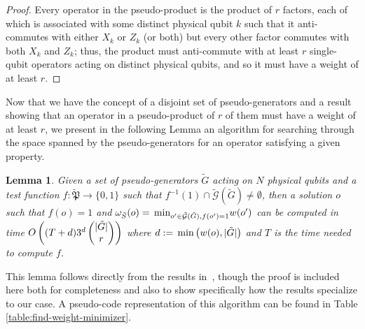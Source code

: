 \documentclass[twocolumn,showpacs,preprintnumbers,amsmath,amssymb,nofootinbib,pra,floatfix]{revtex4-1}
\newtheorem{lemma}{Lemma}
\newenvironment{remark}[1][Remark]{\begin{trivlist}
\item[\hskip \labelsep {\bfseries #1}]}{\end{trivlist}}
\newcommand{\set}{\tilde}
\newcommand{\genfun}{\tilde{\mathcal{G}}}
\newcommand{\pauligroup}{{\set{\mathfrak{P}}}}
\begin{document}
\begin{proof}
Every operator in the pseudo-product is the product of $r$ factors, each of which is associated with some distinct physical qubit $k$ such that it anti-commutes with either $X_k$ or $Z_k$ (or both) but every other factor commutes with both $X_k$ and $Z_k$;  thus, the product must anti-commute with at least $r$ single-qubit operators acting on distinct physical qubits, and so it must have a weight of at least $r$.
\end{proof}
\begin{remark}
Now that we have the concept of a disjoint set of pseudo-generators and a result showing that an operator in a pseudo-product of $r$ of them must have a weight of at least $r$, we present in the following Lemma an algorithm for searching through the space spanned by the pseudo-generators for an operator satisfying a given property.
\end{remark}

\begin{lemma}
\label{lemma:minimal-weight-search}
Given a set of pseudo-generators $\set G$ acting on $N$ physical qubits and a test function $f:\pauligroup\to\{0,1\}$ such that $f^{-1}(1)\cap\genfun(\set G)\ne\emptyset$, then a solution $o$ such that $f(o)=1$ and $\om_{\set S}(o)=\min_{o'\in \genfun(\set G), f(o')=1} w(o')$ can be computed in time $O\paren{(T+d)3^d\choose{|\set G|}{r}}$ where $d:=\min\paren{w(o),|\set G|}$ and $T$ is the time needed to compute $f$.
\end{lemma}

\begin{remark}
This lemma follows directly from the results in~\cite{White:2006fj}, though the proof is included here both for completeness and also to show specifically how the results specialize to our case.  A pseudo-code representation of this algorithm can be found in Table \ref{table:find-weight-minimizer}.
\end{remark}
\end{document}
